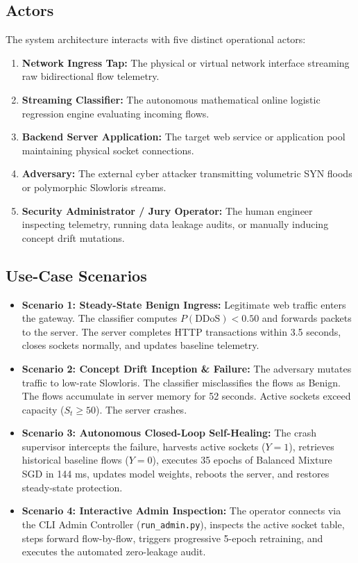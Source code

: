 \documentclass[12pt,a4paper,oneside]{report}
\begin{document}
\subsection{Actors}
The system architecture interacts with five distinct operational actors:
\begin{enumerate}
    \item \textbf{Network Ingress Tap:} The physical or virtual network interface streaming raw bidirectional flow telemetry.
    \item \textbf{Streaming Classifier:} The autonomous mathematical online logistic regression engine evaluating incoming flows.
    \item \textbf{Backend Server Application:} The target web service or application pool maintaining physical socket connections.
    \item \textbf{Adversary:} The external cyber attacker transmitting volumetric SYN floods or polymorphic Slowloris streams.
    \item \textbf{Security Administrator / Jury Operator:} The human engineer inspecting telemetry, running data leakage audits, or manually inducing concept drift mutations.
\end{enumerate}

\subsection{Use-Case Scenarios}
\begin{itemize}
    \item \textbf{Scenario 1: Steady-State Benign Ingress:} Legitimate web traffic enters the gateway. The classifier computes $P(\text{DDoS}) < 0.50$ and forwards packets to the server. The server completes HTTP transactions within 3.5 seconds, closes sockets normally, and updates baseline telemetry.
    \item \textbf{Scenario 2: Concept Drift Inception \& Failure:} The adversary mutates traffic to low-rate Slowloris. The classifier misclassifies the flows as Benign. The flows accumulate in server memory for 52 seconds. Active sockets exceed capacity ($S_t \ge 50$). The server crashes.
    \item \textbf{Scenario 3: Autonomous Closed-Loop Self-Healing:} The crash supervisor intercepts the failure, harvests active sockets ($Y=1$), retrieves historical baseline flows ($Y=0$), executes 35 epochs of Balanced Mixture SGD in 144 ms, updates model weights, reboots the server, and restores steady-state protection.
    \item \textbf{Scenario 4: Interactive Admin Inspection:} The operator connects via the CLI Admin Controller (\texttt{run\_admin.py}), inspects the active socket table, steps forward flow-by-flow, triggers progressive 5-epoch retraining, and executes the automated zero-leakage audit.
\end{itemize}
\end{document}
